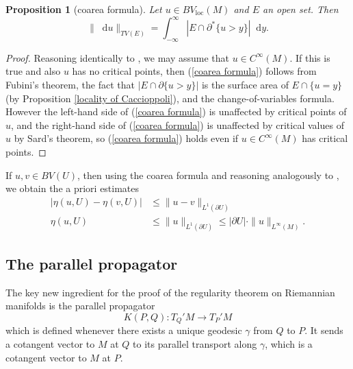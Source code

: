 \documentclass[reqno,11pt]{amsart}
\newcommand*\dif{\mathop{}\!\mathrm{d}}
\newcommand{\loc}{\mathrm{loc}}
\newtheorem{proposition}[theorem]{Proposition}
\theoremstyle{definition}
\numberwithin{equation}{section}
\begin{document}

\begin{proposition}[coarea formula]\label{Coarea2}
Let $u \in BV_\loc(M)$ and $E$ an open set. Then
\begin{equation}\label{coarea formula}
\|\dif u\|_{TV(E)} = \int_{-\infty}^\infty |E \cap \partial^* \{u > y\}| \dif y.
\end{equation}
\end{proposition}
\begin{proof}
Reasoning identically to \cite[Theorem 1.23]{Giusti77}, we may assume that $u \in C^\infty(M)$.
If this is true and also $u$ has no critical points, then (\ref{coarea formula}) follows from Fubini's theorem, the fact that $|E \cap \partial \{u > y\}|$ is the surface area of $E \cap \{u = y\}$ (by Proposition \ref{locality of Caccioppoli}), and the change-of-variables formula.
However the left-hand side of (\ref{coarea formula}) is unaffected by critical points of $u$, and the right-hand side of (\ref{coarea formula}) is unaffected by critical values of $u$ by Sard's theorem, so (\ref{coarea formula}) holds even if $u \in C^\infty(M)$ has critical points.
\end{proof}

If $u, v \in BV(U)$, then using the coarea formula and reasoning analogously to \cite[Lemma 5.6]{Giusti77}, we obtain the a priori estimates
\begin{align}
|\eta(u, U) - \eta(v, U)| &\leq \|u - v\|_{L^1(\partial U)} \label{a priori estimate 1} \\
\eta(u, U) &\leq \|u\|_{L^1(\partial U)} \leq |\partial U| \cdot \|u\|_{L^\infty(M)}. \label{a priori estimate 2}
\end{align}

\subsection{The parallel propagator}
The key new ingredient for the proof of the regularity theorem on Riemannian manifolds is the parallel propagator
$$K(P, Q): T_Q'M \to T_P'M$$
which is defined whenever there exists a unique geodesic $\gamma$ from $Q$ to $P$.
It sends a cotangent vector to $M$ at $Q$ to its parallel transport along $\gamma$, which is a cotangent vector to $M$ at $P$.
\end{document}

